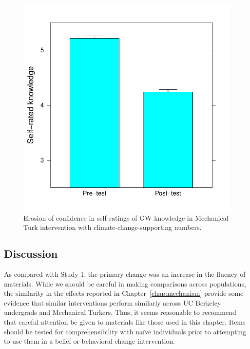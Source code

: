 \begin{figure}
    \centering
    \includegraphics{CCO-prondi-knw.pdf}
    \caption{Erosion of confidence in self-ratings of GW knowledge in Mechanical
        Turk intervention with climate-change-supporting numbers.}
    \label{fig:prondi-knw}
\end{figure}

% 

\subsection{Discussion}

As compared with Study 1, the primary change was an increase in the fluency of
materials. While we should be careful in making comparisons across populations,
the similarity in the effects reported in Chapter~\ref{chap:mechanism} provide
some evidence that similar interventions perform similarly across UC Berkeley
undergrads and Mechanical Turkers. Thus, it seems reasonable to recommend that
careful attention be given to materials like those used in this chapter. Items
should be tested for comprehensibility with naïve individuals prior to
attempting to use them in a belief or behavioral change intervention.

